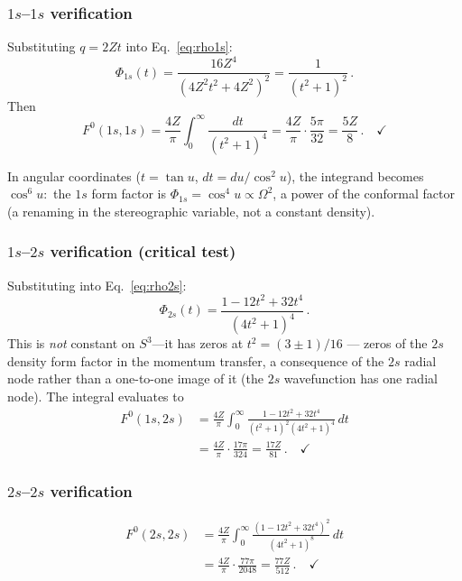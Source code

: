 \documentclass[aps,pra,twocolumn,superscriptaddress,longbibliography]{revtex4-2}
\newcommand{\gvq}[2]{#2}
\begin{document}
\subsubsection{$1s$--$1s$ verification}

Substituting $q = 2Zt$ into Eq.~\eqref{eq:rho1s}:
\begin{equation}
  \Phi_{1s}(t) = \frac{16Z^4}{(4Z^2 t^2 + 4Z^2)^2}
  = \frac{1}{(t^2 + 1)^2} \,.
  \label{eq:phi1s}
\end{equation}
Then
\begin{equation}
  F^0(1s,1s) = \frac{4Z}{\pi} \int_0^\infty
  \frac{dt}{(t^2+1)^4}
  = \frac{4Z}{\pi} \cdot \frac{5\pi}{32}
  = \gvq{slater_f0_1s}{\frac{5Z}{8}} \,. \quad\checkmark
\end{equation}

In angular coordinates ($t = \tan u$, $dt = du/\cos^2 u$),
the integrand becomes $\cos^6 u$:\ the $1s$ form factor is
$\Phi_{1s} = \cos^4 u \propto \Omega^2$, a power of the conformal factor
(a renaming in the stereographic variable, not a constant density).

\subsubsection{$1s$--$2s$ verification (critical test)}

Substituting into Eq.~\eqref{eq:rho2s}:
\begin{equation}
  \Phi_{2s}(t) = \frac{1 - 12t^2 + 32t^4}{(4t^2 + 1)^4} \,.
  \label{eq:phi2s}
\end{equation}
This is \emph{not} constant on $S^3$---it has zeros at
$t^2 = (3 \pm 1)/16$ --- zeros of the $2s$ density form factor in
the momentum transfer, a consequence of the $2s$ radial node rather than
a one-to-one image of it (the $2s$ wavefunction has one radial node). The integral evaluates to
\begin{align}
  F^0(1s,2s) &= \frac{4Z}{\pi} \int_0^\infty
  \frac{1 - 12t^2 + 32t^4}{(t^2+1)^2 (4t^2+1)^4} \, dt \nonumber\\
  &= \frac{4Z}{\pi} \cdot \frac{17\pi}{324}
  = \frac{17Z}{81} \,. \quad\checkmark
\end{align}

\subsubsection{$2s$--$2s$ verification}

\begin{align}
  F^0(2s,2s) &= \frac{4Z}{\pi} \int_0^\infty
  \frac{(1 - 12t^2 + 32t^4)^2}{(4t^2+1)^8} \, dt \nonumber\\
  &= \frac{4Z}{\pi} \cdot \frac{77\pi}{2048}
  = \frac{77Z}{512} \,. \quad\checkmark
\end{align}
\end{document}
